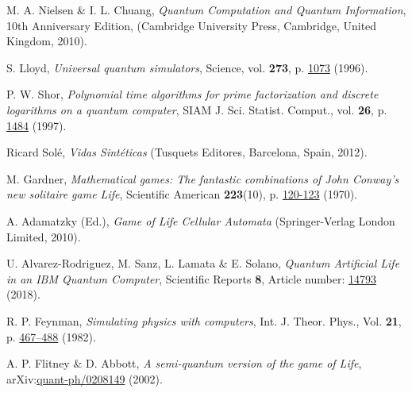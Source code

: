 \documentclass[11pt]{article}
\numberwithin{equation}{section} %
\numberwithin{figure}{section} %
\begin{document}
\newpage

\begin{thebibliography}{X}

 M. A. Nielsen \& I. L. Chuang, {\it Quantum Computation and Quantum Information}, 10th Anniversary Edition,  (Cambridge University Press, Cambridge, United Kingdom, 2010).

 S. Lloyd, {\it Universal quantum simulators}, Science, vol. {\bf 273}, p. \href{http://science.sciencemag.org/content/273/5278/1073}{1073} (1996).

 P. W. Shor, {\it Polynomial time algorithms for prime factorization and discrete logarithms on a quantum computer}, SIAM J. Sci. Statist. Comput., vol. {\bf 26}, p. \href{https://epubs.siam.org/doi/10.1137/S0097539795293172}{1484} (1997).

 Ricard Sol\'{e}, {\it Vidas Sint\'{e}ticas} (Tusquets Editores, Barcelona, Spain, 2012).


 M. Gardner, {\it Mathematical games: The fantastic combinations of John Conway’s new solitaire game Life}, Scientific American {\bf 223}(10), p. \href{https://web.stanford.edu/class/sts145/Library/life.pdf}{120-123} (1970).

 A. Adamatzky (Ed.), {\it Game of Life Cellular Automata} (Springer-Verlag London Limited, 2010).


 U. Alvarez-Rodriguez, M. Sanz, L. Lamata \& E. Solano, {\it Quantum Artificial Life in an IBM Quantum Computer}, Scientific Reports {\bf 8}, Article number: \href{https://www.nature.com/articles/s41598-018-33125-3.pdf}{14793} (2018).

 R. P. Feynman, {\it Simulating physics with computers}, Int. J. Theor. Phys., Vol. {\bf 21}, p. \href{https://link.springer.com/article/10.1007/BF02650179}{467–488} (1982).

 A. P. Flitney \& D. Abbott, {\it A semi-quantum version of the game of Life}, arXiv:\href{https://arxiv.org/abs/quant-ph/0208149}{quant-ph/0208149} (2002).


\end{thebibliography}
\end{document}
